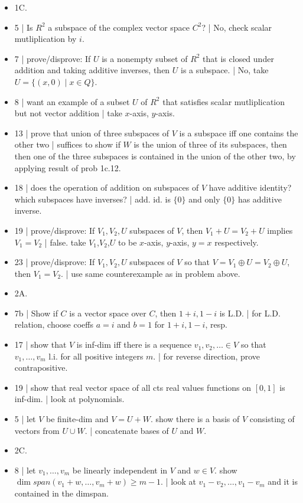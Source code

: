 

\begin{itemize}
	\item 1C. 
	\item 5 | Is $R^2$ a subspace of the complex vector space $C^2$? | No, check scalar mutliplication by $i$. 
	\item 7 | prove/disprove: If $U$ is a nonempty subset of $R^2$ that is closed under addition and taking additive inverses, then $U$ is a subspace. | No, take $U = \{(x,0) \mid x \in Q\}$. 
	\item 8 | want an example of a subset $U$ of $R^2$ that satisfies scalar mutliplication but not vector addition | take $x$-axis, $y$-axis. 
	\item 13 | prove that union of three subspaces of $V$ is a subspace iff one contains the other two | suffices to show if $W$ is the union of three of its subspaces, then then one of the three subspaces is contained in the union of the other two, by applying result of prob 1c.12. 
	\item 18 | does the operation of addition on subspaces of $V$ have additive identity? which subspaces have inverses? | add. id. is $\{0\}$ and only $\{0\}$ has additive inverse. 
	\item 19 | prove/disprove: If $V_1,V_2,U$ subspaces of $V$, then $V_1 + U = V_2 + U$ implies $V_1 = V_2$ | false. take $V_1$,$V_2$,$U$ to be $x$-axis, $y$-axis, $y=x$ respectively. 
	\item 23 | prove/disprove: If $V_1,V_2,U$ subspaces of $V$ so that $V=V_1 \oplus U = V_2 \oplus U$, then $V_1=V_2$. | use same counterexample as in problem above. 
	\item 2A. 
	\item 7b | Show if $C$ is a vector space over $C$, then $1+i,1-i$ is L.D. | for L.D. relation, choose coeffs $a=i$ and $b=1$ for $1+i,1-i$, resp. 
	\item 17 | show that $V$ is inf-dim iff there is a sequence $v_1,v_2,\dots \in V$ so that $v_1,\dots,v_m$ l.i. for all positive integers $m$. | for reverse direction, prove contrapositive. 
	\item 19 | show that real vector space of all cts real values functions on $[0,1]$ is inf-dim. | look at polynomials. 
	\item 5 | let $V$ be finite-dim and $V=U+W$. show there is a basis of $V$ consisting of vectors from $U \cup W$. | concatenate bases of $U$ and $W$.
	\item 2C. 
	\item 8 | let $v_1,\dots,v_m$ be linearly independent in $V$ and $w \in V$. show $\dim span(v_1+w,\dots,v_m+w) \geq m-1$. | look at $v_1-v_2,\dots,v_1-v_m$ and it is contained in the dimspan. 

\end{itemize}
